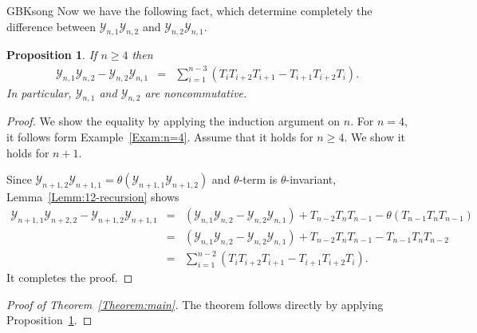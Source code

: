 \documentclass[13pt,a4paper, oneside]{amsart}       %
\numberwithin{equation}{section}
\newtheorem{proposition}[equation]{Proposition}
\theoremstyle{definition}
\theoremstyle{remark}
\begin{document}
\begin{CJK*}{GBK}{song}
 Now we have the following fact, which determine completely the difference between $\mathscr{Y}_{n,1}\mathscr{Y}_{n,2}$ and $\mathscr{Y}_{n,2}\mathscr{Y}_{n,1}$.

\begin{proposition}\label{Prop:12-diff}If  $n\geq 4$ then
\begin{eqnarray*}
 \mathscr{Y}_{n,1}\mathscr{Y}_{n,2}-\mathscr{Y}_{n,2}\mathscr{Y}_{n,1}&=&
\sum_{i=1}^{n-3}(T_iT_{i+2}T_{i+1}-T_{i+1}T_{i+2}T_i).
\end{eqnarray*}
In particular, $\mathscr{Y}_{n,1}$ and $\mathscr{Y}_{n,2}$ are noncommutative.
\end{proposition}
\begin{proof}We show the equality by applying the induction argument on $n$. For $n=4$, it follows form Example~\ref{Exam:n=4}. Assume that it holds for $n\geq 4$. We show it holds for $n+1$.

Since $\mathscr{Y}_{n+1,2}\mathscr{Y}_{n+1,1}=
\theta(\mathscr{Y}_{n+1,1}\mathscr{Y}_{n+1,2})$ and $\theta$-term is $\theta$-invariant, Lemma~\ref{Lemm:12-recursion} shows
\begin{eqnarray*}
 \mathscr{Y}_{n+1,1}\mathscr{Y}_{n+2,2}-\mathscr{Y}_{n+1,2}\mathscr{Y}_{n+1,1}
 &=&(\mathscr{Y}_{n,1}\mathscr{Y}_{n,2}-\mathscr{Y}_{n,2}\mathscr{Y}_{n,1})
+T_{n-2}T_{n}T_{n-1}-\theta(T_{n-1}T_{n}T_{n-1})\\
 &=&(\mathscr{Y}_{n,1}\mathscr{Y}_{n,2}-\mathscr{Y}_{n,2}\mathscr{Y}_{n,1})
+T_{n-2}T_{n}T_{n-1}-T_{n-1}T_nT_{n-2}\\
&=&\sum_{i=1}^{n-2}(T_iT_{i+2}T_{i+1}-T_{i+1}T_{i+2}T_i).
\end{eqnarray*}
It completes the proof.
\end{proof}

\begin{proof}[Proof of Theorem~\ref{Theorem:main}]The theorem follows directly by applying Proposition~\ref{Prop:12-diff}.
\end{proof}


\end{CJK*}
\end{document}
